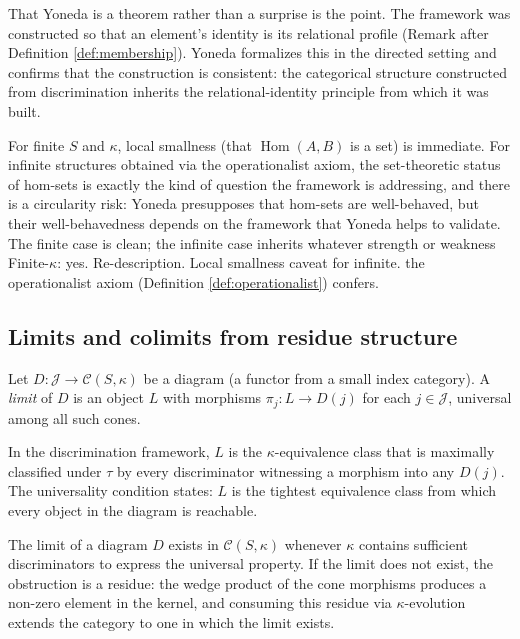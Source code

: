 \begin{remark}
That Yoneda is a theorem rather than a surprise is the point.
The framework was constructed so that an element's identity is
its relational profile (Remark after Definition
\ref{def:membership}). Yoneda formalizes this in the directed
setting and confirms that the construction is consistent:
the categorical structure constructed from discrimination
inherits the relational-identity principle from which it
was built.

For finite $S$ and $\kappa$, local smallness (that
$\operatorname{Hom}(A,B)$ is a set) is immediate. For
infinite structures obtained via the operationalist
axiom, the set-theoretic status of hom-sets is exactly
the kind of question the framework is addressing, and
there is a circularity risk: Yoneda presupposes that
hom-sets are well-behaved, but their well-behavedness
depends on the framework that Yoneda helps to validate.
The finite case is clean; the infinite case inherits
whatever strength or weakness Finite-$\kappa$: yes. Re-description. Local smallness caveat for infinite. the operationalist axiom (Definition \ref{def:operationalist})
confers.
\end{remark}

\subsection{Limits and colimits from residue structure}

\begin{definition}\label{def:limit}
Let $D: \mathcal{J} \to \mathcal{C}(S,\kappa)$ be a diagram
(a functor from a small index category). A \emph{limit} of
$D$ is an object $L$ with morphisms $\pi_j: L \to D(j)$
for each $j \in \mathcal{J}$, universal among all such cones.

In the discrimination framework, $L$ is the $\kappa$-equivalence
class that is maximally classified under $\tau$ by every
discriminator witnessing a morphism into any $D(j)$. The
universality condition states: $L$ is the tightest equivalence
class from which every object in the diagram is reachable.
\end{definition}

\begin{proposition}
\label{prop:limits}
The limit of a diagram $D$ exists in $\mathcal{C}(S,\kappa)$
whenever $\kappa$ contains sufficient discriminators to
express the universal property. If the limit does not exist,
the obstruction is a residue: the wedge product of the cone
morphisms produces a non-zero element in the kernel, and
consuming this residue via $\kappa$-evolution extends the
category to one in which the limit exists.
\end{proposition}

